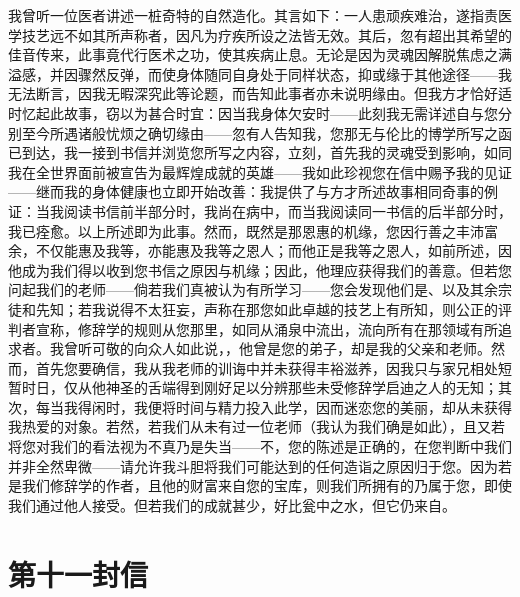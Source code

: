 我曾听一位医者讲述一桩奇特的自然造化。其言如下：一人患顽疾难治，遂指责医学技艺远不如其所声称者，因凡为疗疾所设之法皆无效。其后，忽有超出其希望的佳音传来，此事竟代行医术之功，使其疾病止息。无论是因为灵魂因解脱焦虑之满溢感，并因骤然反弹，而使身体随同自身处于同样状态，抑或缘于其他途径——我无法断言，因我无暇深究此等论题，而告知此事者亦未说明缘由。但我方才恰好适时忆起此故事，窃以为甚合时宜：因当我身体欠安时——此刻我无需详述自与您分别至今所遇诸般忧烦之确切缘由——忽有人告知我，您那无与伦比的博学所写之函已到达，我一接到书信并浏览您所写之内容，立刻，首先我的灵魂受到影响，如同我在全世界面前被宣告为最辉煌成就的英雄——我如此珍视您在信中赐予我的见证——继而我的身体健康也立即开始改善：我提供了与方才所述故事相同奇事的例证：当我阅读书信前半部分时，我尚在病中，而当我阅读同一书信的后半部分时，我已痊愈。以上所述即为此事。然而，既然是那恩惠的机缘，您因行善之丰沛富余，不仅能惠及我等，亦能惠及我等之恩人；而他正是我等之恩人，如前所述，因他成为我们得以收到您书信之原因与机缘；因此，他理应获得我们的善意。但若您问起我们的老师——倘若我们真被认为有所学习——您会发现他们是、以及其余宗徒和先知；若我说得不太狂妄，声称在那您如此卓越的技艺上有所知，则公正的评判者宣称，修辞学的规则从您那里，如同从涌泉中流出，流向所有在那领域有所追求者。我曾听可敬的向众人如此说，，他曾是您的弟子，却是我的父亲和老师。然而，首先您要确信，我从我老师的训诲中并未获得丰裕滋养，因我只与家兄相处短暂时日，仅从他神圣的舌端得到刚好足以分辨那些未受修辞学启迪之人的无知；其次，每当我得闲时，我便将时间与精力投入此学，因而迷恋您的美丽，却从未获得我热爱的对象。若然，若我们从未有过一位老师（我认为我们确是如此），且又若将您对我们的看法视为不真乃是失当——不，您的陈述是正确的，在您判断中我们并非全然卑微——请允许我斗胆将我们可能达到的任何造诣之原因归于您。因为若是我们修辞学的作者，且他的财富来自您的宝库，则我们所拥有的乃属于您，即使我们通过他人接受。但若我们的成就甚少，好比瓮中之水，但它仍来自。\par



\section{第十一封信}

